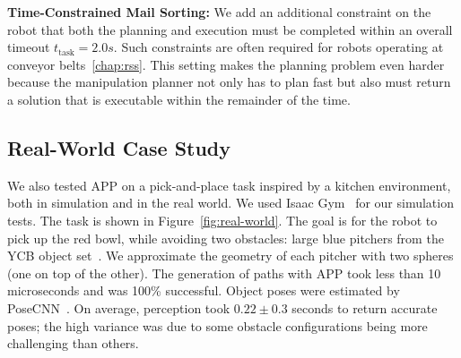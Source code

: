 \documentclass[a4paper]{report}
\begin{document}
\textbf{Time-Constrained Mail Sorting:}
We add an additional constraint on the robot that both the planning and execution must be completed within an overall timeout $t_\textrm{task}=2.0s$. Such constraints are often required for robots operating at conveyor belts~\ref{chap:rss}. This setting makes the planning problem even harder because the manipulation planner not only has to plan fast but also must return a solution that is executable within the remainder of the time.

\subsection{Real-World Case Study}
We also tested APP on a pick-and-place task inspired by a kitchen environment, both in simulation and in the real world. We used Isaac Gym~\cite{liang2018gpu} for our simulation tests. The task is shown in Figure~\ref{fig:real-world}. The goal is for the robot to pick up the red bowl, while avoiding two obstacles: large blue pitchers from the YCB object set~\cite{calli2015ycb}. We approximate the geometry of each pitcher with two spheres (one on top of the other).
The generation of paths with APP took less than 10 microseconds and was 100\% successful. Object poses were estimated by PoseCNN~\cite{xiang2017posecnn}.
On average, perception took $0.22 \pm 0.3$ seconds to return accurate poses; the high variance was due to some obstacle configurations being more challenging than others.
\end{document}
